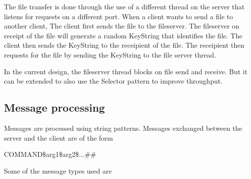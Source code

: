 \documentclass{article}
\begin{document}
The file transfer is done through the use of a different thread on the server that listens for requests on a different port. When a client wants to send a file to another client, The client first sends the file to the fileserver. The fileserver on receipt of the file will generate a random KeyString that identifies the file. The client then sends the KeyString to the receipient of the file. The receipient then requests for the file by sending the KeyString to the file server thread.

In the current design, the fileserver thread blocks on file send and receive. But it can be extended to also use the Selector pattern to improve throughput.

\subsection{Message processing}

Messages are processed using string patterns.
Messages exchanged between the server and the client are of the form

COMMAND\$arg1\$arg2\$...\#\#

Some of the message types used are
\end{document}

